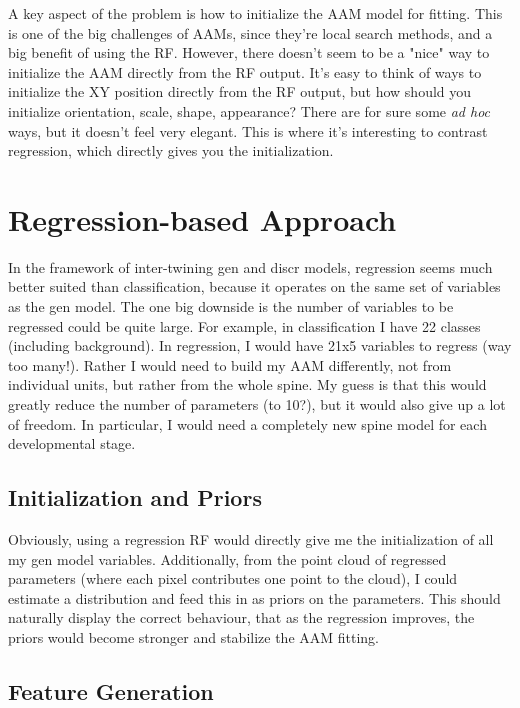 \documentclass[10pt,twocolumn,letterpaper]{article}
\begin{document}
A key aspect of the problem is how to initialize the AAM model for fitting.  This is one of the big challenges of AAMs, since they're local search methods, and a big benefit of using the RF.  However, there doesn't seem to be a "nice" way to initialize the AAM directly from the RF output.  It's easy to think of ways to initialize the XY position directly from the RF output, but how should you initialize orientation, scale, shape, appearance?  There are for sure some \emph{ad hoc} ways, but it doesn't feel very elegant.  This is where it's interesting to contrast regression, which directly gives you the initialization.

\section{Regression-based Approach}

In the framework of inter-twining gen and discr models, regression seems much better suited than classification, because it operates on the same set of variables as the gen model.  The one big downside is the number of variables to be regressed could be quite large.  For example, in classification I have 22 classes (including background).  In regression, I would have 21x5 variables to regress (way too many!).  Rather I would need to build my AAM differently, not from individual units, but rather from the whole spine.  My guess is that this would greatly reduce the number of parameters (to 10?), but it would also give up a lot of freedom.  In particular, I would need a completely new spine model for each developmental stage.

\subsection{Initialization and Priors}

Obviously, using a regression RF would directly give me the initialization of all my gen model variables.  Additionally, from the point cloud of regressed parameters (where each pixel contributes one point to the cloud), I could estimate a distribution and feed this in as priors on the parameters.  This should naturally display the correct behaviour, that as the regression improves, the priors would become stronger and stabilize the AAM fitting.

\subsection{Feature Generation}
\end{document}
